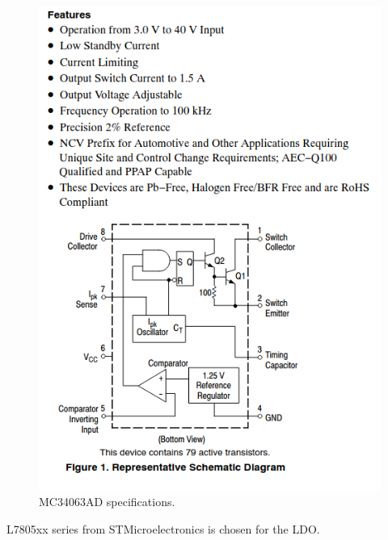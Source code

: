 \documentclass[../main.tex]{subfiles}
\begin{document}
    \begin{figure}[!h]
        \centerline{\includegraphics[scale=0.5]{media/MC34063AD_specs.png}}
        \caption{MC34063AD specifications.}
        \label{fig:MC34063AD_specs}
    \end{figure}

    \justify
    L7805xx series from STMicroelectronics \cite{L78} is chosen for the LDO.




    \stopsubchapters
    
\end{document}
